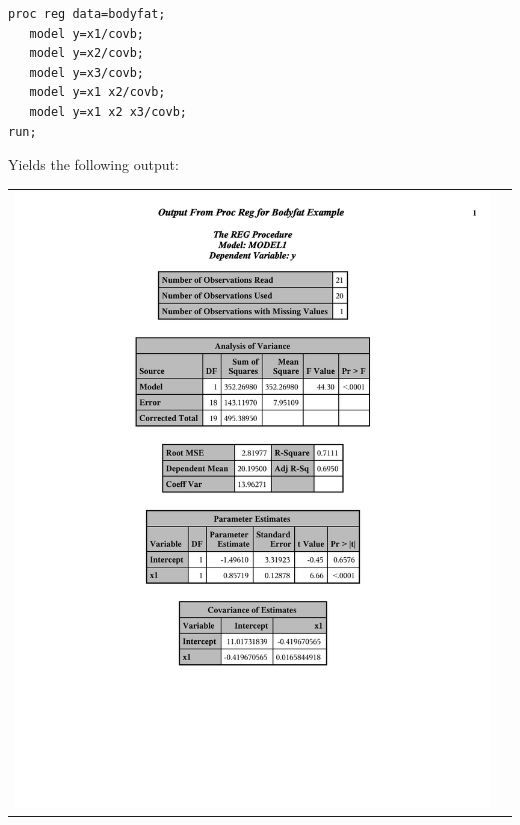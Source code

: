 \begin{small}
\begin{verbatim}
proc reg data=bodyfat;
   model y=x1/covb;
   model y=x2/covb;
   model y=x3/covb;
   model y=x1 x2/covb;
   model y=x1 x2 x3/covb;
run;
\end{verbatim}
\end{small}
Yields the following output:
\begin{center}
\begin{tabular}{cc}
\includegraphics[page=1,scale=0.6,trim=40mm 30mm 20mm 10mm]{bodyfatexample}&

\end{tabular}
\end{center}
